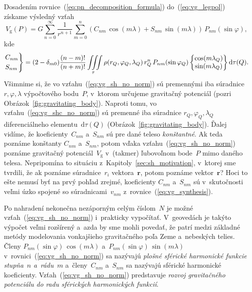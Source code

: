 \documentclass[a4paper,12pt]{book}
\newcommand{\diff}{\mathrm d}
\newcommand{\gidx}{\mathrm g}
\let\vec\mathbf
\begin{document}
Dosadením rovnice~(\ref{eq:pn_decomposition_formula}) do~(\ref{eq:vg_legpol})
získame výsledný vzťah
%
\begin{equation}
\label{eq:vg_sh_no_norm}
V_\gidx(P) = G \sum_{n = 0}^\infty \frac{1}{r^{n + 1}} \sum_{m = 0}^{n} \left(
C_{nm} \, \cos(m\lambda) + S_{nm} \, \sin(m\lambda)\right) \,
P_{nm}(\sin\varphi){,}
\end{equation}
%
kde
%
\begin{equation}
\label{eq:vg_shc_no_norm}
\begin{rcases}
C_{nm}\\
S_{nm}
\end{rcases}
= (2 - \delta_{m0}) \frac{(n - m)!}{(n + m)!} \iiint\limits_{\tau} \rho(r_Q,
\varphi_Q, \lambda_Q) \, r_Q^n \, P_{nm}(\sin\varphi_Q)
%
\begin{Bmatrix}
\cos(m\lambda_Q)\\
\sin(m\lambda_Q)
\end{Bmatrix}
%
\diff\tau(Q){.}
\end{equation}
%
Všimnime si, že vo vzťahu~(\ref{eq:vg_sh_no_norm}) sú premennými iba súradnice 
$r, \varphi, \lambda$ výpočtového bodu~$P$, v~ktorom určujeme gravitačný 
potenciál (pozri Obrázok~\ref{fig:gravitating_body}).  Naproti tomu, vo 
vzťahu~(\ref{eq:vg_shc_no_norm}) sú premenné iba súradnice $r_Q,\varphi_Q, 
\lambda_Q$ diferenciálneho elementu~$\diff\tau(Q)$ 
(Obrázok~\ref{fig:gravitating_body}).  Ďalej vidíme, že koeficienty~$C_{nm}$ 
a~$S_{nm}$ sú pre dané teleso \emph{konštantné}.  Ak teda poznáme konštanty 
$C_{nm}$ a~$S_{nm}$, potom vďaka vzťahu~(\ref{eq:vg_sh_no_norm}) poznáme 
gravitačný potenciál~$V_\gidx$ v~(takmer) ľubovoľnom bode~$P$ mimo daného 
telesa.  Nepripomína to situáciu z~Kapitoly~\ref{sec:sh_motivation}, v~ktorej 
sme tvrdili, že ak poznáme súradnice~$r_i$ vektora~$\vec r$, potom poznáme 
vektor~$\vec r$?  Hoci to ešte nemusí byť na prvý pohľad zrejmé, koeficienty 
$C_{nm}$ a~$S_{nm}$ sú v~skutočnosti veľmi úzko spojené so súradnicami~$v_{nm}$ 
z~rovnice~(\ref{eq:vg_synthesis}).

Po nahradení nekonečna nezáporným celým číslom~$N$ je možné 
vzťah~(\ref{eq:vg_sh_no_norm}) i~prakticky vypočítať.  V~geovedách je takýto
výpočet veľmi rozšírený a~azda by sme mohli povedať, že patrí medzi základné  
metódy modelovania vonkajšieho
gravitačného poľa Zeme a~nebeských telies.  Členy $P_{nm}(\sin\varphi) \,
\cos(m\lambda)$ a~$ P_{nm}(\sin\varphi) \, \sin(m\lambda)$
v~rovnici~(\ref{eq:vg_sh_no_norm}) sa nazývajú \emph{plošné sférické harmonické
funkcie stupňa~$n$ a~rádu~$m$} a~členy~$C_{nm}$ a~$S_{nm}$ sa nazývajú sférické
harmonické koeficienty.  Vzťah~(\ref{eq:vg_sh_no_norm}) predstavuje
\emph{rozvoj gravitačného potenciálu do radu sférických harmonických funkcií}.
\end{document}
